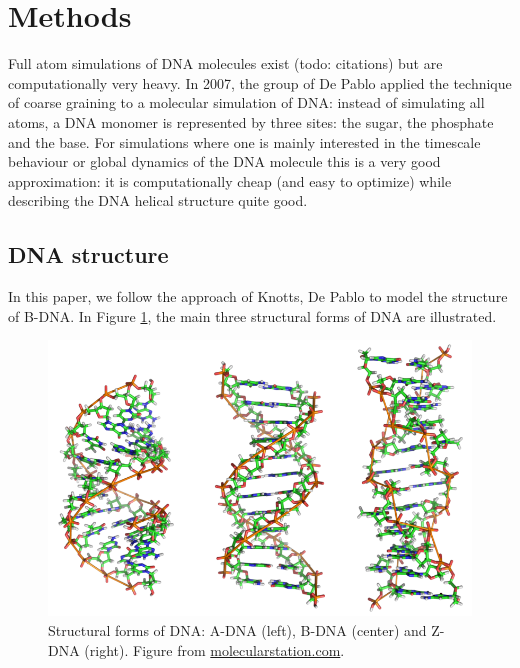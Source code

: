 \section{Methods}

Full atom simulations of DNA molecules exist (todo: citations) but are computationally very heavy. In 2007, the group of De Pablo \cite{knotts2007coarse} applied the technique of coarse graining to a molecular simulation of DNA: instead of simulating all atoms, a DNA monomer is represented by three sites: the sugar, the phosphate and the base. For simulations where one is mainly interested in the timescale behaviour or global dynamics of the DNA molecule this is a very good approximation: it is computationally cheap (and easy to optimize) while describing the DNA helical structure quite good. 

\subsection{DNA structure}

In this paper, we follow the approach of Knotts, De Pablo \etal \cite{knotts2007coarse} to model the structure of B-DNA. In Figure \ref{dna_forms}, the main three structural forms of DNA are illustrated.

\begin{figure}[htbp]
\begin{center}
\includegraphics[width=14cm]{dna_forms.png}
\caption{Structural forms of DNA: A-DNA (left), B-DNA (center) and Z-DNA (right). Figure from \href{http://www.molecularstation.com}{molecularstation.com}.}
\label{dna_forms}
\end{center}
\end{figure}


